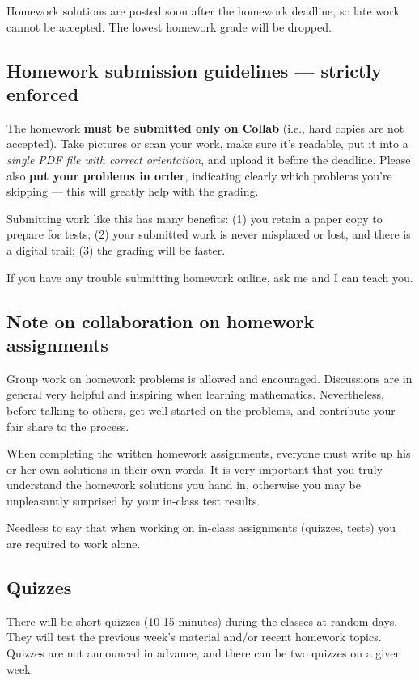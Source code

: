 \documentclass[oneside,11pt]{amsart}
\begin{document}
Homework solutions are posted soon after the
homework deadline, so late work cannot be accepted.
The lowest homework grade will be dropped.

\subsection*{Homework submission guidelines --- strictly enforced}
The homework \textbf{must be submitted only on Collab} (i.e., hard copies are not accepted).
Take pictures or scan your work,
make sure it's readable,
put it into a \emph{single PDF file with correct orientation},
and upload it before the deadline.
Please also \textbf{put your problems in order}, indicating clearly which problems you're skipping --- this will greatly help with the grading.

Submitting work like this has many benefits:
(1) you retain a paper copy to
prepare for tests;
(2) your submitted work is never misplaced or lost, and there is a digital trail;
(3) the grading will be faster.

If you have any trouble submitting homework online, ask me and I can teach you.

\subsection*{Note on collaboration on homework assignments}
\label{collaboration}

Group work on homework problems is allowed and encouraged.
Discussions are in general very
helpful and inspiring when learning mathematics.
Nevertheless, before talking to others, get well started
on the problems, and contribute your fair share to the process.

When completing the written homework assignments, everyone must write up his or her own
solutions in their own words.
It is very important that you truly understand the homework solutions you hand
in, otherwise you may be unpleasantly surprised by your in-class test results.

Needless to say that when working on in-class assignments (quizzes, tests)
you are required to work alone.

\subsection{Quizzes}

There will be short quizzes (10-15 minutes)
during the classes at random days. 
They will test the previous week's material and/or recent homework
topics. 
Quizzes are not announced in advance, and there can be two quizzes
on a given week. 
\end{document}
